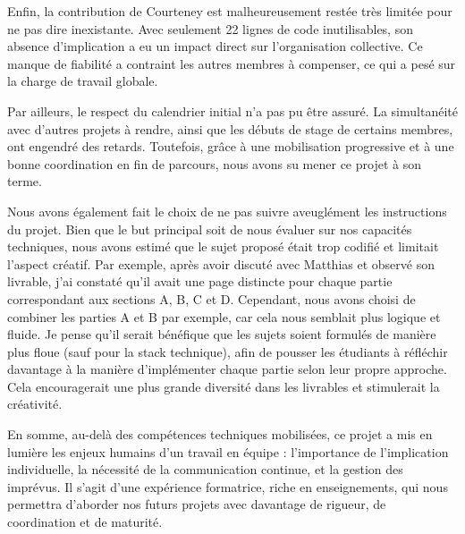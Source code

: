 \documentclass[11pt]{article}
\begin{document}
Enfin, la contribution de Courteney est malheureusement restée très limitée pour ne pas dire inexistante. Avec seulement 22 lignes de code inutilisables, son absence d’implication a eu un impact direct sur l’organisation collective. Ce manque de fiabilité a contraint les autres membres à compenser, ce qui a pesé sur la charge de travail globale.

Par ailleurs, le respect du calendrier initial n’a pas pu être assuré. La simultanéité avec d’autres projets à rendre, ainsi que les débuts de stage de certains membres, ont engendré des retards. Toutefois, grâce à une mobilisation progressive et à une bonne coordination en fin de parcours, nous avons su mener ce projet à son terme.

Nous avons également fait le choix de ne pas suivre aveuglément les instructions du projet. Bien que le but principal soit de nous évaluer sur nos capacités techniques, nous avons estimé que le sujet proposé était trop codifié et limitait l'aspect créatif. Par exemple, après avoir discuté avec Matthias et observé son livrable, j'ai constaté qu'il avait une page distincte pour chaque partie correspondant aux sections A, B, C et D. Cependant, nous avons choisi de combiner les parties A et B par exemple, car cela nous semblait plus logique et fluide. Je pense qu'il serait bénéfique que les sujets soient formulés de manière plus floue (sauf pour la stack technique), afin de pousser les étudiants à réfléchir davantage à la manière d'implémenter chaque partie selon leur propre approche. Cela encouragerait une plus grande diversité dans les livrables et stimulerait la créativité.

En somme, au-delà des compétences techniques mobilisées, ce projet a mis en lumière les enjeux humains d’un travail en équipe : l’importance de l’implication individuelle, la nécessité de la communication continue, et la gestion des imprévus. Il s’agit d’une expérience formatrice, riche en enseignements, qui nous permettra d’aborder nos futurs projets avec davantage de rigueur, de coordination et de maturité.

\pagebreak

\listoffigures
\end{document}
